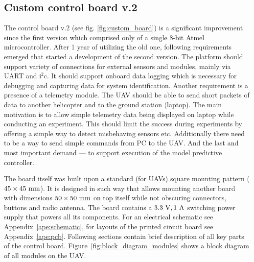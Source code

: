 \subsection{Custom control board v.2}

The control board v.2 (see fig. \ref{fig:custom_board}) is a significant improvement since the first version \citep{baca2013} which comprised only of a single 8-bit Atmel microcontroller. After 1 year of utilizing the old one, following requirements emerged that started a development of the second version. The platform should support variety of connections for external sensors and modules, mainly via UART and $\mathrm{i}^2\mathrm{c}$. It should support onboard data logging which is necessary for debugging and capturing data for system identification. Another requirement is a presence of a telemetry module. The UAV should be able to send short packets of data to another helicopter and to the ground station (laptop). The main motivation is to allow simple telemetry data being displayed on laptop while conducting an experiment. This should limit the success during experiments by offering a simple way to detect misbehaving sensors etc. Additionally there need to be a way to send simple commands from PC to the UAV. And the last and most important demand --- to support execution of the model predictive controller.

The board itself was built upon a standard (for UAVs) square mounting pattern ($45\times 45~\mathrm{mm}$). It is designed in such way that allows mounting another board with dimensions $50\times 50~\mathrm{mm}$ on top itself while not obscuring connectors, buttons and radio antenna. The board contains a $3.3~\mathrm{V}, 1~\mathrm{A}$ switching power supply that powers all its components. For an electrical schematic see Appendix~\ref{ape:schematic}, for layouts of the printed circuit board see Appendix~\ref{ape:pcb}. Following sections contain brief description of all key parts of the control board. Figure~\ref{fig:block_diagram_modules} shows a block diagram of all modules on the UAV.

